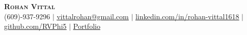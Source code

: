 \documentclass[letterpaper,11pt]{article}
\begin{document}
\begin{center}
    \textbf{\Huge \scshape Rohan Vittal} \\ \vspace{1pt}
    \small (609)-937-9296 $|$ \href{mailto:vittalrohan@gmail.com}{\underline{vittalrohan@gmail.com}} $|$
    \href{https://www.linkedin.com/in/rohan-vittal1618}{\underline{linkedin.com/in/rohan-vittal1618}} $|$
    \href{https://github.com/RVPhi5}{\underline{github.com/RVPhi5}} $|$
    \href{https://rohan-vittal-portfolio.vercel.app/}{\underline{Portfolio}}
\end{center}
\end{document}
